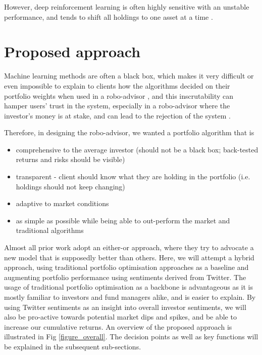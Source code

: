 \documentclass{article}
\begin{document}
However, deep reinforcement learning is often highly sensitive with an unstable performance, and tends to shift all holdings to one asset at a time \cite{liang2018adversarial}.

\section{Proposed approach}
\label{sec:proposed approach}

Machine learning methods are often a black box, which makes it very difficult or even impossible to explain to clients how the algorithms decided on their portfolio weights when used in a robo-advisor \cite{darksecretAI_2017}, and this inscrutability can hamper users’ trust in the system, especially in a robo-advisor where the investor's money is at stake, and can lead to the rejection of the system \cite{rai2020explainable}.


Therefore, in designing the robo-advisor, we wanted a portfolio algorithm that is
\begin{itemize}
    \setlength{\itemsep}{0pt}
    \setlength{\parskip}{0pt}
    \setlength{\parsep}{0pt}
    \item comprehensive to the average investor (should not be a black box; back-tested returns and risks should be visible)
    \item transparent - client should know what they are holding in the portfolio (i.e. holdings should not keep changing)
    \item adaptive to market conditions
    \item as simple as possible while being able to out-perform the market and traditional algorithms
\end{itemize}

Almost all prior work adopt an either-or approach, where they try to advocate a new model that is supposedly better than others. Here, we will attempt a hybrid approach, using traditional portfolio optimisation approaches as a baseline and augmenting portfolio performance using sentiments derived from Twitter. The usage of traditional portfolio optimisation as a backbone is advantageous as it is mostly familiar to investors and fund managers alike, and is easier to explain. By using Twitter sentiments as an insight into overall investor sentiments, we will also be pro-active towards potential market dips and spikes, and be able to increase our cumulative returns. An overview of the proposed approach is illustrated in Fig \ref{figure_overall}. The decision points as well as key functions will be explained in the subsequent sub-sections.
\end{document}
